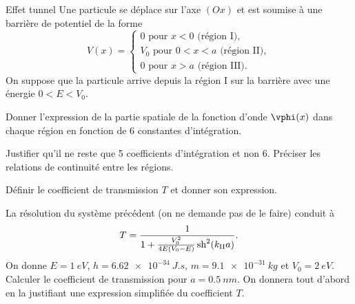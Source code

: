 \begin{exo}[PC][2]{Effet tunnel}
Une particule se déplace sur l'axe $(Ox)$ et est soumise à une barrière de potentiel de la forme
\begin{equation*}
V(x)=\begin{cases}
0 \mbox{ pour } x<0 \mbox{ (région I)},\\
V_{0} \mbox{ pour } 0<x<a \mbox{ (région II)},\\
0 \mbox{ pour } x>a \mbox{ (région III)}.
\end{cases}
\end{equation*}
On suppose que la particule arrive depuis la région I sur la barrière avec une énergie $0<E<V_0$.
\begin{quest}
\item Donner l'expression de la partie spatiale de la fonction d'onde $\vphi(x)$ dans chaque région en fonction de 6 constantes d'intégration.
\item  Justifier qu'il ne reste que 5 coefficients d'intégration et non 6. Préciser les relations de continuité entre les régions.
\item %
Définir le coefficient de transmission $T$ et donner son expression.
\item La résolution du système précédent (on ne demande pas de le faire) conduit à
\begin{equation*}
T=\frac{1}{1+\frac{V_0^2}{4E(V_{0}-E)}\,\mathrm{sh}^{2}(k_{\rm{II}}a)}.
\end{equation*}
On donne $E=\SI{1}{eV}$, $h=\SI{6,62e-34}{J.s}$, $m=\SI{9,1e-31}{kg}$ et $V_{0}=\SI{2}{eV}$. Calculer le coefficient de transmission pour $a=\SI{0,5}{nm}$. On donnera tout d'abord en la justifiant une expression simplifiée du coefficient $T$.
\end{quest}
\end{exo}

